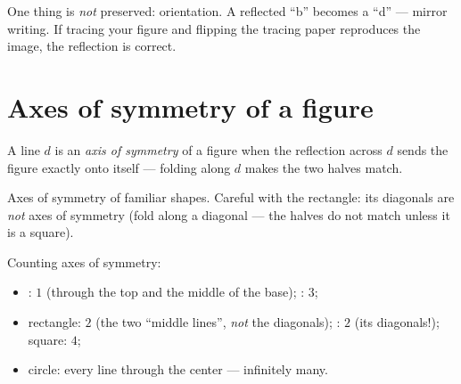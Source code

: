 \begin{remark}
One thing is \emph{not} preserved: orientation. A reflected ``b''
becomes a ``d'' --- mirror writing. If tracing your figure and flipping
the tracing paper reproduces the image, the reflection is correct.
\end{remark}

\section{Axes of symmetry of a figure}

\begin{definition}\label{def:g6:symmetry:axis}
A line $d$ is an \emph{axis of symmetry} of a
figure when the reflection across $d$ sends the figure exactly onto
itself --- folding along $d$ makes the two halves match.
\end{definition}

\begin{omfigure}

{\small Axes of symmetry of familiar shapes. Careful with the
rectangle: its diagonals are \emph{not} axes of symmetry (fold along a
diagonal --- the halves do not match unless it is a square).}
\end{omfigure}

\begin{example}\label{ex:g6:symmetry:shapes}
Counting axes of symmetry:
\begin{itemize}
  \item {}: $1$ (through the top  and the middle
        of the base); : $3$;
  \item rectangle: $2$ (the two ``middle lines'', \emph{not} the
        diagonals); : $2$ (its diagonals!); square: $4$;
  \item circle: every line through the center --- infinitely many.
\end{itemize}
\end{example}

